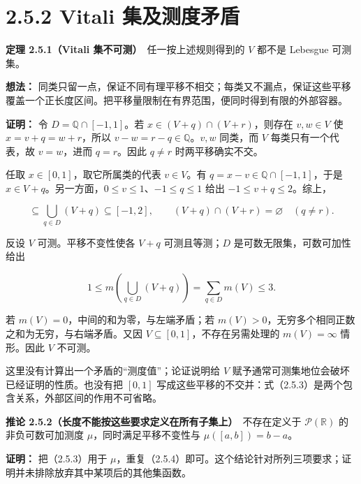 \documentclass[11pt,a4paper]{article}
\begin{document}
\section[\S{}2.5.2 Vitali
集及测度矛盾]{2.5.2 Vitali
集及测度矛盾}\label{vitali-ux96c6ux53caux6d4bux5ea6ux77dbux76fe}

\textbf{定理 2.5.1（Vitali 集不可测）}　任一按上述规则得到的 \(V\)
都不是 Lebesgue 可测集。

\textbf{想法：}
同类只留一点，保证不同有理平移不相交；每类又不漏点，保证这些平移覆盖一个正长度区间。把平移量限制在有界范围，便同时得到有限的外部容器。

\textbf{证明：} 令 \(D=\mathbb Q\cap[-1,1]\)。若
\(x\in(V+q)\cap(V+r)\)，则存在 \(v,w\in V\) 使 \(x=v+q=w+r\)，所以
\(v-w=r-q\in\mathbb Q\)。\(v,w\) 同类，而 \(V\) 每类只有一个代表，故
\(v=w\)，进而 \(q=r\)。因此 \(q\ne r\) 时两平移确实不交。

任取 \(x\in[0,1]\)，取它所属类的代表 \(v\in V\)。有
\(q=x-v\in\mathbb Q\cap[-1,1]\)，于是
\(x\in V+q\)。另一方面，\(0\le v\le1\)、\(-1\le q\le1\) 给出
\(-1\le v+q\le2\)。综上，

\begin{equation*}
[0,1]\subseteq\bigcup_{q\in D}(V+q)\subseteq[-1,2],
\qquad (V+q)\cap(V+r)=\varnothing\quad(q\ne r).
\tag{2.5.3}
\end{equation*}

反设 \(V\) 可测。平移不变性使各 \(V+q\) 可测且等测；\(D\)
是可数无限集，可数可加性给出

\begin{equation*}
1\le m\left(\bigcup_{q\in D}(V+q)\right)
=\sum_{q\in D}m(V)\le3.
\tag{2.5.4}
\end{equation*}

若 \(m(V)=0\)，中间的和为零，与左端矛盾；若
\(m(V)>0\)，无穷多个相同正数之和为无穷，与右端矛盾。又因
\(V\subseteq[0,1]\)，不存在另需处理的 \(m(V)=\infty\) 情形。因此 \(V\)
不可测。

这里没有计算出一个矛盾的``测度值''；论证说明给 \(V\)
赋予通常可测集地位会破坏已经证明的性质。也没有把 \([0,1]\)
写成这些平移的不交并：式（2.5.3）是两个包含关系，外部区间的作用不可省略。

\textbf{推论 2.5.2（长度不能按这些要求定义在所有子集上）}　不存在定义于
\(\mathcal P(\mathbb R)\) 的非负可数可加测度
\(\mu\)，同时满足平移不变性与 \(\mu([a,b])=b-a\)。

\textbf{证明：} 把（2.5.3）用于
\(\mu\)，重复（2.5.4）即可。这个结论针对所列三项要求；证明并未排除放弃其中某项后的其他集函数。
\end{document}
